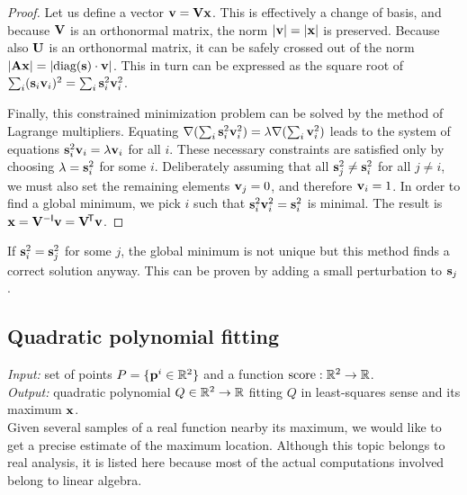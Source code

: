 \begin{proof}
Let us define a vector $\mathbf{v} = \mathbf{V} \mathbf{x}$.
This is effectively a change of basis, and because $\mathbf{V}$ is an orthonormal matrix, the norm $|\mathbf{v}| = |\mathbf{x}|$ is preserved.
Because also $\mathbf{U}$ is an orthonormal matrix, it can be safely crossed out of the norm $|\mathbf{A} \mathbf{x}| = |\textrm{diag}(\mathbf{s}) \cdot \mathbf{v}|$.
This in turn can be expressed as the square root of $\sum_i (\mathbf{s}_i \mathbf{v}_i)^2 = \sum_i \mathbf{s}_i^2 \mathbf{v}_i^2$.

Finally, this constrained minimization problem can be solved by the method of Lagrange multipliers.
Equating $\nabla(\sum_i \mathbf{s}_i^2 \mathbf{v}_i^2) = \lambda \nabla (\sum_i \mathbf{v}_i^2)$ leads to the system of equations $\mathbf{s}_i^2 \mathbf{v}_i = \lambda \mathbf{v}_i$ for all $i$.
These necessary constraints are satisfied only by choosing $\lambda = \mathbf{s}_i^2$ for some $i$.
Deliberately assuming that all $\mathbf{s}_j^2 \neq \mathbf{s}_i^2$ for all $j \neq i$, we must also set the remaining elements $\mathbf{v}_j = 0$, and therefore $\mathbf{v}_i = 1$.
In order to find a global minimum, we pick $i$ such that $\mathbf{s}_i^2 \mathbf{v}_i^2 = \mathbf{s}_i^2$ is minimal.
The result is $\mathbf{x} = \mathbf{V} ^{-\mathsf{I}} \mathbf{v} = \mathbf{V} ^{\!\mathsf{T}} \mathbf{v}$.
\end{proof}

If $\mathbf{s}_i^2 = \mathbf{s}_j^2$ for some $j$, the global minimum is not unique but this method finds a correct solution anyway.
This can be proven by adding a small perturbation to $\mathbf{s}_j$.

\subsection{Quadratic polynomial fitting}
\textit{Input:} set of points $P = \{\mathbf{p}^i \in \mathbb{R}^2 \}$ and a function $\textrm{score}: \mathbb{R}^2 \rightarrow \mathbb{R}$.\\
\textit{Output:} quadratic polynomial $Q \in \mathbb{R}^2 \rightarrow \mathbb{R}$ fitting $Q$ in least-squares sense and its maximum $\mathbf{x}$.\\

Given several samples of a real function nearby its maximum, we would like to get a precise estimate of the maximum location.
Although this topic belongs to real analysis, it is listed here because most of the actual computations involved belong to linear algebra.

